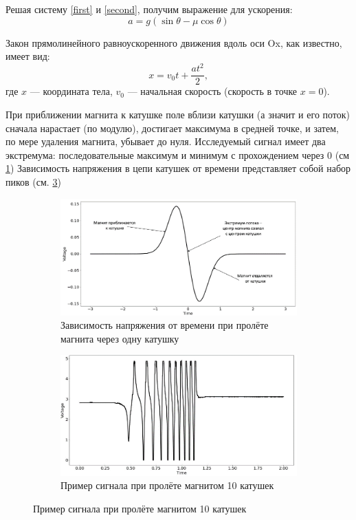 \documentclass[
	a4paper, %
	12pt, %
]{article}
\begin{document}
	Решая систему \ref{first} и \ref{second}, получим выражение для ускорения:
	\begin{equation}
		a = g(\sin{\theta} - \mu\cos{\theta})
	\end{equation}
	
	Закон прямолинейного равноускоренного движения вдоль оси Ox, как известно, имеет вид:
	\begin{equation}
		x = v_{0}t + \frac{at^{2}}{2},
	\end{equation}
	где $x$ — координата тела, $v_0$ — начальная скорость (скорость в точке $x=0$).
	
	При приближении магнита к катушке поле вблизи катушки (а значит и его поток)
	сначала нарастает (по модулю), достигает максимума в средней точке, и затем, по мере удаления магнита, убывает до нуля. Исследуемый сигнал имеет два экстремума: последовательные максимум и минимум с прохождением через 0 (см \ref{fig:subim3}) Зависимость напряжения в цепи катушек от времени представляет собой набор пиков (см. \ref{fig:subim4})
	
	\begin{figure}[h]
		\begin{subfigure}{0.5\textwidth}
			\includegraphics[width=0.9\linewidth]{once.png} 
			\caption{Зависимость напряжения от времени при пролёте магнита через одну катушку}
			\label{fig:subim3}
		\end{subfigure}
		\begin{subfigure}{0.5\textwidth}
			\includegraphics[width=0.9\linewidth]{multi.png}
			\caption{Пример сигнала при пролёте магнитом 10 катушек}
			\label{fig:subim4}
		\end{subfigure}
	\end{figure}
	
\end{document}
